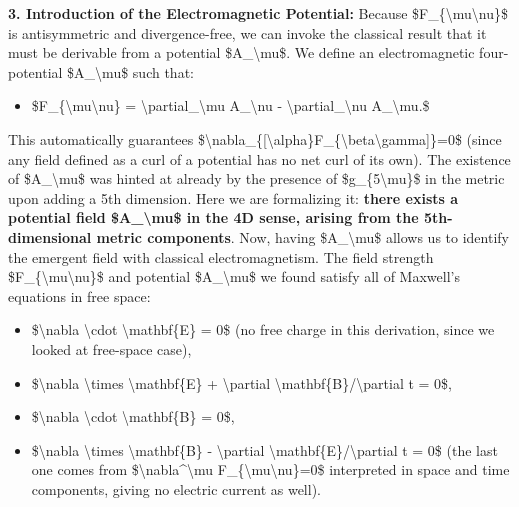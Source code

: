 \documentclass[]{article}
\begin{document}
\textbf{3. Introduction of the Electromagnetic Potential:} Because
\$F\_\{\textbackslash{}mu\textbackslash{}nu\}\$ is antisymmetric and
divergence-free, we can invoke the classical result that it must be
derivable from a potential \$A\_\textbackslash{}mu\$. We define an
electromagnetic four-potential \$A\_\textbackslash{}mu\$ such that:

\begin{itemize}
\item
  \$F\_\{\textbackslash{}mu\textbackslash{}nu\} =
  \textbackslash{}partial\_\textbackslash{}mu A\_\textbackslash{}nu -
  \textbackslash{}partial\_\textbackslash{}nu A\_\textbackslash{}mu.\$
\end{itemize}

This automatically guarantees
\$\textbackslash{}nabla\_\{{[}\textbackslash{}alpha\}F\_\{\textbackslash{}beta\textbackslash{}gamma{]}\}=0\$
(since any field defined as a curl of a potential has no net curl of its
own). The existence of \$A\_\textbackslash{}mu\$ was hinted at already
by the presence of \$g\_\{5\textbackslash{}mu\}\$ in the metric upon
adding a 5th dimension. Here we are formalizing it: \textbf{there exists
a potential field \$A\_\textbackslash{}mu\$ in the 4D sense, arising
from the 5th-dimensional metric components}​. Now, having
\$A\_\textbackslash{}mu\$ allows us to identify the emergent field with
classical electromagnetism. The field strength
\$F\_\{\textbackslash{}mu\textbackslash{}nu\}\$ and potential
\$A\_\textbackslash{}mu\$ we found satisfy all of Maxwell's equations in
free space:

\begin{itemize}
\item
  \$\textbackslash{}nabla \textbackslash{}cdot
  \textbackslash{}mathbf\{E\} = 0\$ (no free charge in this derivation,
  since we looked at free-space case),
\item
  \$\textbackslash{}nabla \textbackslash{}times
  \textbackslash{}mathbf\{E\} + \textbackslash{}partial
  \textbackslash{}mathbf\{B\}/\textbackslash{}partial t = 0\$,
\item
  \$\textbackslash{}nabla \textbackslash{}cdot
  \textbackslash{}mathbf\{B\} = 0\$,
\item
  \$\textbackslash{}nabla \textbackslash{}times
  \textbackslash{}mathbf\{B\} - \textbackslash{}partial
  \textbackslash{}mathbf\{E\}/\textbackslash{}partial t = 0\$ (the last
  one comes from \$\textbackslash{}nabla\^{}\textbackslash{}mu
  F\_\{\textbackslash{}mu\textbackslash{}nu\}=0\$ interpreted in space
  and time components, giving no electric current as well).
\end{itemize}
\end{document}
